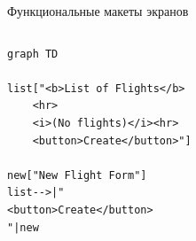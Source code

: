 \documentclass[aspectratio=169,handout,bigger]{beamer}
\begin{document}
\begin{frame}[fragile]{Функциональные макеты экранов}
  \begin{columns}
    \begin{column}{.5\textwidth}
\begin{verbatim}
graph TD

list["<b>List of Flights</b>
    <hr>
    <i>(No flights)</i><hr>
    <button>Create</button>"]

new["New Flight Form"]
list-->|"
<button>Create</button>
"|new
\end{verbatim}
  \end{column}
  \begin{column}{.5\textwidth}
  \end{column}
  \end{columns}
\end{frame}

\end{document}
